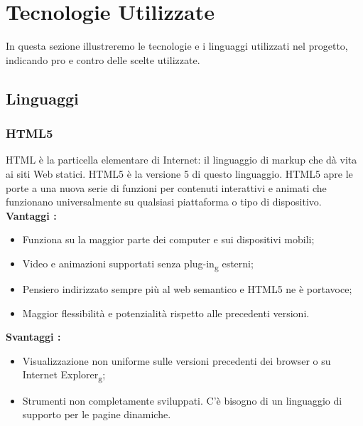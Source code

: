 \section{Tecnologie Utilizzate}{
	In questa sezione illustreremo le tecnologie e i linguaggi utilizzati nel progetto, indicando pro e contro delle scelte utilizzate.
	\subsection{Linguaggi}{
		\subsubsection{HTML5}{
			HTML è la particella elementare di Internet: il linguaggio di markup che dà vita ai siti Web statici. HTML5 è la versione 5 di questo linguaggio. HTML5 apre le porte a una nuova serie di funzioni per contenuti interattivi e animati che funzionano universalmente su qualsiasi piattaforma o tipo di dispositivo.
			\textbf{Vantaggi :}
			\begin{itemize}\itemsep1pt
				\item Funziona su la maggior parte dei computer e sui dispositivi mobili;
				\item Video e animazioni supportati senza plug-in\textsubscript{g} esterni;
				\item Pensiero indirizzato sempre più al web semantico e HTML5 ne è portavoce;
				\item Maggior flessibilità e potenzialità rispetto alle precedenti versioni.
			\end{itemize}
			\textbf{Svantaggi :}
			\begin{itemize}\itemsep1pt
				\item Visualizzazione non uniforme sulle versioni precedenti dei browser o su Internet Explorer\textsubscript{g};
				\item Strumenti non completamente sviluppati. C'è bisogno di un linguaggio di supporto per le pagine dinamiche.
			\end{itemize}
		}
}}
